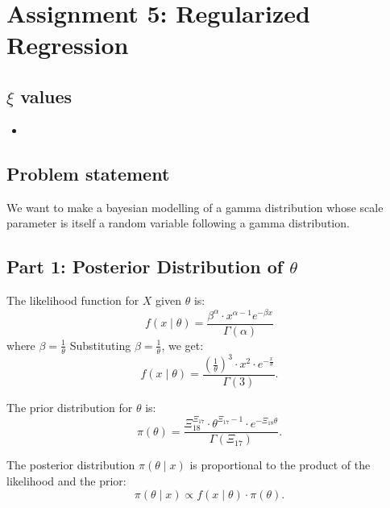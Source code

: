 \chapter{Assignment 5: Regularized Regression}

\section*{$\xi$ values}

\begin{itemize}
\item 
\end{itemize}

\section{Problem statement}

We want to make a bayesian modelling of a gamma distribution whose scale parameter is itself a random variable following a gamma distribution.



\section*{Part 1: Posterior Distribution of $\theta$}

The likelihood function for $X$ given $\theta$ is:
\begin{equation}
f(x \mid \theta) = \frac{\beta^\alpha \cdot x^{\alpha-1} e^{-\beta x}}{\Gamma(\alpha)}
\end{equation}
where $\beta = \frac{1}{\theta}$
Substituting $\beta = \frac{1}{\theta}$, we get:
\begin{equation}
f(x \mid \theta) = \frac{\left(\frac{1}{\theta}\right)^3 \cdot x^2 \cdot e^{-\frac{x}{\theta}}}{\Gamma(3)}.
\end{equation}

The prior distribution for $\theta$ is:
\begin{equation}
\pi(\theta) = \frac{\Xi_{18}^{\Xi_{17}} \cdot \theta^{\Xi_{17}-1} \cdot e^{-\Xi_{18} \theta}}{\Gamma(\Xi_{17})}.
\end{equation}

The posterior distribution $\pi(\theta \mid x)$ is proportional to the product of the likelihood and the prior:
\begin{equation}
\pi(\theta \mid x) \propto f(x \mid \theta) \cdot \pi(\theta).
\end{equation}

